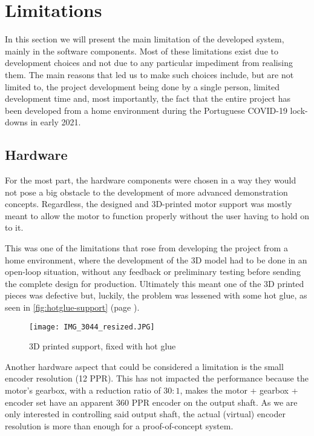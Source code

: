 \section{Limitations} \label{sec:limitations}
In this section we will present the main limitation of the developed system, mainly in the software components.
Most of these limitations exist due to development choices and not due to any particular impediment from realising them.
The main reasons that led us to make such choices include, but are not limited to, the project development being done by a single person, limited development time and, most importantly, the fact that the entire project has been developed from a home environment during the Portuguese COVID-19 lock-downs in early 2021.

\subsection{Hardware}
For the most part, the hardware components were chosen in a way they would not pose a big obstacle to the development of more advanced demonstration concepts.
Regardless, the designed and 3D-printed motor support was mostly meant to allow the motor to function properly without the user having to hold on to it.

This was one of the limitations that rose from developing the project from a home environment, where the development of the 3D model had to be done in an open-loop situation, without any feedback or preliminary testing before sending the complete design for production.
Ultimately this meant one of the 3D printed pieces was defective but, luckily, the problem was lessened with some hot glue, as seen in \autoref{fig:hotglue-support} (page \pageref{fig:hotglue-support}).

\begin{figure}[t]
	\centering
	\texttt{[image: IMG\_3044\_resized.JPG]}
	\caption{3D printed support, fixed with hot glue}
	\label{fig:hotglue-support}
\end{figure}

Another hardware aspect that could be considered a limitation is the small encoder resolution (12 PPR).
This has not impacted the performance because the motor's gearbox, with a reduction ratio of $30:1$, makes the motor + gearbox + encoder set have an apparent 360 PPR encoder on the output shaft.
As we are only interested in controlling said output shaft, the actual (virtual) encoder resolution is more than enough for a proof-of-concept system.

